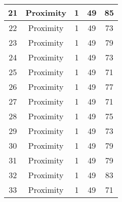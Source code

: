 \documentclass[results.tex]{subfiles}
\begin{document}
\begin{center}
\begin{tabular}{| c || c | c | c | c |}
            \hline
            21                      & Proximity                    & 1                      & 49                      & 85                   \\
            \hline
            22                      & Proximity                    & 1                      & 49                      & 73                   \\
            \hline
            23                      & Proximity                    & 1                      & 49                      & 79                   \\
            \hline
            24                      & Proximity                    & 1                      & 49                      & 73                   \\
            \hline
            25                      & Proximity                    & 1                      & 49                      & 71                   \\
            \hline
            26                      & Proximity                    & 1                      & 49                      & 77                   \\
            \hline
            27                      & Proximity                    & 1                      & 49                      & 71                   \\
            \hline
            28                      & Proximity                    & 1                      & 49                      & 75                   \\
            \hline
            29                      & Proximity                    & 1                      & 49                      & 73                   \\
            \hline
            30                      & Proximity                    & 1                      & 49                      & 79                   \\
            \hline
            31                      & Proximity                    & 1                      & 49                      & 79                   \\
            \hline
            32                      & Proximity                    & 1                      & 49                      & 83                   \\
            \hline
            33                      & Proximity                    & 1                      & 49                      & 71                   \\

\end{tabular}
\end{center}
\end{document}

